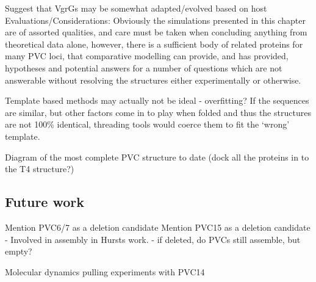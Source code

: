 Suggest that VgrGs may be somewhat adapted/evolved based on host
Evaluations/Considerations:
Obviously the simulations presented in this chapter are of assorted qualities, and care must be taken when concluding anything from theoretical data alone, however, there is a sufficient body of related proteins for many PVC loci, that comparative modelling can provide, and has provided, hypotheses and potential answers for a number of questions which are not answerable without resolving the structures either experimentally or otherwise.

Template based methods may actually not be ideal - overfitting? If the sequences are similar, but other factors come in to play when folded and thus the structures are not 100\% identical, threading tools would coerce them to fit the `wrong' template.

Diagram of the most complete PVC structure to date (dock all the proteins in to the T4 structure?)


\subsection{Future work}
Mention PVC6/7 as a deletion candidate
Mention PVC15 as a deletion candidate
 - Involved in assembly in Hursts work.
 - if deleted, do PVCs still assemble, but empty?
 
 Molecular dynamics pulling experiments with PVC14
 




